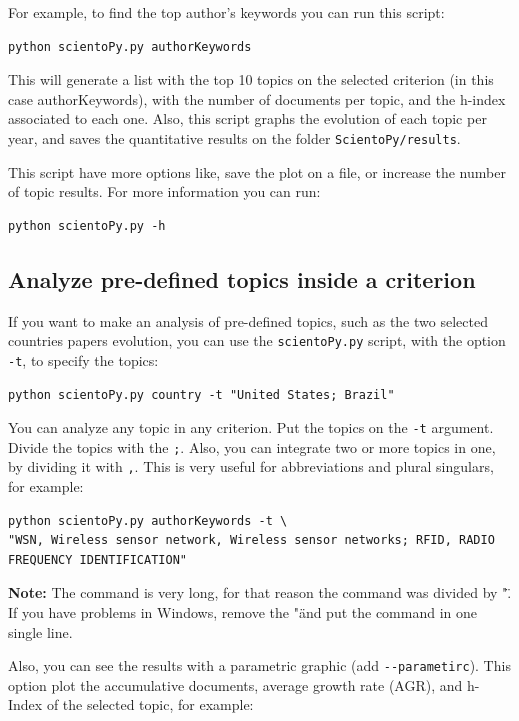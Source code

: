 \documentclass[10pt,letterpaper]{article}
\begin{document}
For example, to find the top author's keywords you can run this script: 

\begin{verbatim}
python scientoPy.py authorKeywords
\end{verbatim}

This will generate a list with the top 10 topics on the selected criterion (in this case authorKeywords), with the number of documents per topic, and the h-index associated to each one. Also, this script graphs the evolution of each topic per year, and saves the quantitative results on the folder \verb|ScientoPy/results|. 

This script have more options like, save the plot on a file, or increase the number of topic results. For more information you can run:

\begin{verbatim}
python scientoPy.py -h
\end{verbatim}

\subsection{Analyze pre-defined topics inside a criterion}

If you want to make an analysis of pre-defined topics, such as the two selected countries papers evolution, you can use the \verb|scientoPy.py| script, with the option \verb|-t|, to specify the topics: 

\begin{verbatim}
python scientoPy.py country -t "United States; Brazil"
\end{verbatim}

You can analyze any topic in any criterion. Put the topics on the \verb|-t| argument. Divide the topics with the \verb|;|. Also, you can integrate two or more topics in one, by dividing it with \verb|,|. This is very useful for abbreviations and plural singulars, for example: 
\begin{verbatim}
python scientoPy.py authorKeywords -t \
"WSN, Wireless sensor network, Wireless sensor networks; RFID, RADIO FREQUENCY IDENTIFICATION"
\end{verbatim}

\textbf{Note: } The command is very long, for that reason the command was divided by "\". If you have problems in Windows, remove the "\" and put the command in one single line.

Also, you can see the results with a parametric graphic (add \verb|--parametirc|). This option plot the accumulative documents, average growth rate (AGR), and h-Index of the selected topic, for example:
\end{document}
